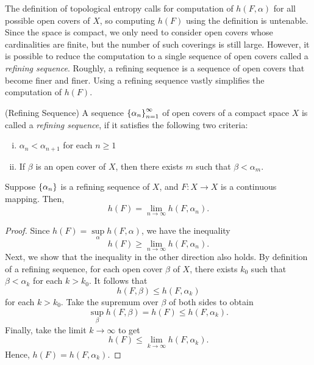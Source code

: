 \documentclass[10pt,twoside,draft]{book}
\begin{document}
The definition of topological entropy calls for computation of $h(F,\alpha)$ for all possible open covers of $X$, so computing $h(F)$ using the definition is untenable.
Since the space is compact, we only need to consider open covers whose cardinalities are finite, but the number of such coverings is still large.
However, it is possible to reduce the computation to a single sequence of open covers called a \textit{refining sequence}.
Roughly, a refining sequence is a sequence of open covers that become finer and finer.
Using a refining sequence vastly simplifies the computation of $h(F)$.
\begin{definition}
  (Refining Sequence)
  A sequence $\left \{ \alpha_n \right \}^{\infty}_{n = 1}$ of open covers of a compact space $X$ is called a \textit{refining sequence}, if it satisfies the following two criteria:
  \begin{enumerate}[(i)]
    \item $\alpha_n < \alpha_{n+1}$ for each $n\geq 1$
    \item If $\beta$ is an open cover of $X$, then there exists $m$ such that $\beta < \alpha_m$.
  \end{enumerate}
\end{definition}
\begin{theorem}
  Suppose $\left \{ \alpha_n \right \}$ is a refining sequence of $X$, and $F:X\to X$ is a continuous mapping.
  Then,
  \begin{equation*}
    h(F) = \lim\limits_{n\to \infty} h(F, \alpha_n).
  \end{equation*}
  \label{thm:t-ent-ref-seq}
  \begin{proof}
    Since $h(F) = \sup\limits_{\alpha} h(F, \alpha)$, we have the inequality
    \begin{equation*}
      h(F) \geq \lim\limits_{n\to \infty} h(F, \alpha_n).
    \end{equation*}
    Next, we show that the inequality in the other direction also holds.
    By definition of a refining sequence, for each open cover $\beta$ of $X$, there exists $k_0$ such that $\beta < \alpha_k$ for each $k > k_0$.
    It follows that
    \begin{equation*}
      h(F, \beta) \leq h(F, \alpha_k)
    \end{equation*}
    for each $k > k_0$.
    Take the supremum over $\beta$ of both sides to obtain
    \begin{equation*}
      \sup\limits_{\beta} h(F, \beta) = h(F) \leq h(F, \alpha_k).
    \end{equation*}
    Finally, take the limit $k \to \infty$ to get
    \begin{equation*}
      h(F) \leq \lim\limits_{k \to \infty} h(F, \alpha_k).
    \end{equation*}
    Hence, $h(F) = h(F, \alpha_k)$.
  \end{proof}
\end{theorem}
\end{document}
